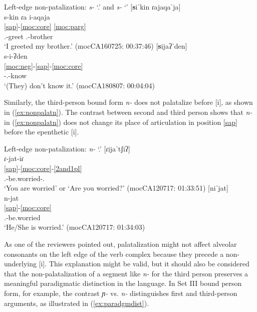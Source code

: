 \documentclass[output=paper]{langscibook}
\begin{document}
\ea \label{ex:nonpalats}
    Left-edge non-patalization: \textit{s-} `\First.\II' and \textit{s-} `\Neg'
    \ea\label{ex:nonpalatsa}
    [\textbf{s}iˈkin ɾajaqaˈja]\\
    \glll s-kin ɾa i-aqaja\\
    \ref{sap}-\ref{moc:core} \ref{moc:parg} \\
    {\First.\II}-greet {\DetFour} {\First.\Poss}-brother\\
    \glt `I greeted my brother.' \hfill(mocCA160725: 00:37:46)
    \ex\label{ex:nonpalatsb} 
    [\textbf{s}ijaʔˈden] \\
    \glll s-i-ʔden \\
    \ref{moc:neg}-\ref{sap}-\ref{moc:core} \\
    {\Neg}-{\Third.\II}-know \\
    \glt `(They) don't know it.' \hfill(mocCA180807: 00:04:04)
    \z
\z

Similarly, the third-person bound form \textit{n-} does not palatalize before [i], as shown in (\ref{ex:nonpalatn}). The contrast between second and third person shows that \textit{n-} in (\ref{ex:nonpalatn}) does not change its place of articulation in position \ref{sap} before the epenthetic [i].


\ea\label{ex:nonpalatn}
    Left-edge non-patalization: \textit{n-} `\Third.\I'
    \ea\label{ex:nonpalatnb} [ɾijaˈtʃiʔ]\\
    \glll ɾ-jat-iɾ\\
    \ref{sap}-\ref{moc:core}-\ref{2and1pl}\\
    {\Second.\I}-be.worried-{\Second.\I}\\
    \glt `You are worried' or `Are you worried?' \hfill(mocCA120717: 01:33:51)
    \ex\label{ex:nonpalatna} [niˈjat]\\
    \glll n-jat\\
    \ref{sap}-\ref{moc:core} \\
    {\First.\I}-be.worried\\
    \glt `He/She is worried.' \hfill(mocCA120717: 01:34:03)
    \z
\z

As one of the reviewers pointed out, palatalization might not affect alveolar consonants on the left edge of the verb complex because they precede a non-underlying [i]. This explanation might be valid, but it should also be considered that the non-palatalization of a segment like \textit{n-} for the third person preserves a meaningful paradigmatic distinction in the language. In Set III bound person form, for example, the contrast \textit{ɲ-} vs. \textit{n-} distinguishes first and third-person arguments, as illustrated in (\ref{ex:paradgmdist}).  
\end{document}
